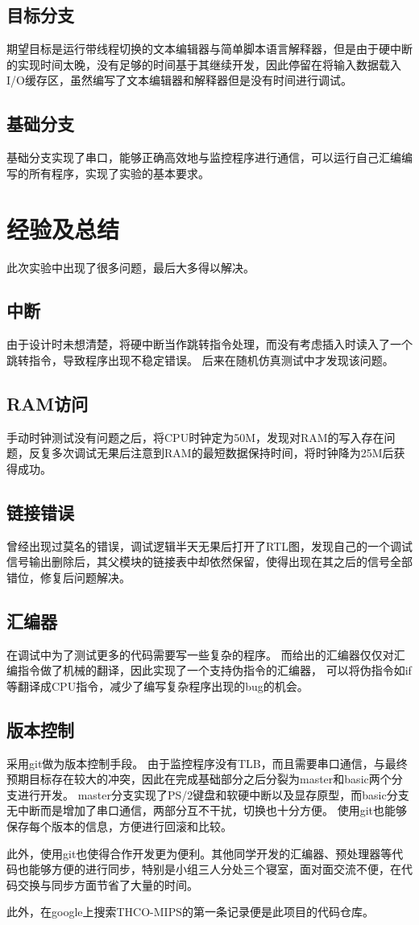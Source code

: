   \subsection{目标分支}
    期望目标是运行带线程切换的文本编辑器与简单脚本语言解释器，但是由于硬中断的实现时间太晚，没有足够的时间基于其继续开发，因此停留在将输入数据载入I/O缓存区，虽然编写了文本编辑器和解释器但是没有时间进行调试。
  \subsection{基础分支}
    基础分支实现了串口，能够正确高效地与监控程序进行通信，可以运行自己汇编编写的所有程序，实现了实验的基本要求。

\section{经验及总结}
  此次实验中出现了很多问题，最后大多得以解决。
  \subsection{中断}
    由于设计时未想清楚，将硬中断当作跳转指令处理，而没有考虑插入时读入了一个跳转指令，导致程序出现不稳定错误。
    后来在随机仿真测试中才发现该问题。
  \subsection{RAM访问}
    手动时钟测试没有问题之后，将CPU时钟定为50M，发现对RAM的写入存在问题，反复多次调试无果后注意到RAM的最短数据保持时间，将时钟降为25M后获得成功。
  \subsection{链接错误}
    曾经出现过莫名的错误，调试逻辑半天无果后打开了RTL图，发现自己的一个调试信号输出删除后，其父模块的链接表中却依然保留，使得出现在其之后的信号全部错位，修复后问题解决。
  \subsection{汇编器}
    在调试中为了测试更多的代码需要写一些复杂的程序。
    而给出的汇编器仅仅对汇编指令做了机械的翻译，因此实现了一个支持伪指令的汇编器，
    可以将伪指令如if等翻译成CPU指令，减少了编写复杂程序出现的bug的机会。
  \subsection{版本控制}
    采用git做为版本控制手段。
    由于监控程序没有TLB，而且需要串口通信，与最终预期目标存在较大的冲突，因此在完成基础部分之后分裂为master和basic两个分支进行开发。
    master分支实现了PS/2键盘和软硬中断以及显存原型，而basic分支无中断而是增加了串口通信，两部分互不干扰，切换也十分方便。
    使用git也能够保存每个版本的信息，方便进行回滚和比较。

    此外，使用git也使得合作开发更为便利。其他同学开发的汇编器、预处理器等代码也能够方便的进行同步，特别是小组三人分处三个寝室，面对面交流不便，在代码交换与同步方面节省了大量的时间。

    此外，在google上搜索THCO-MIPS的第一条记录便是此项目的代码仓库。

